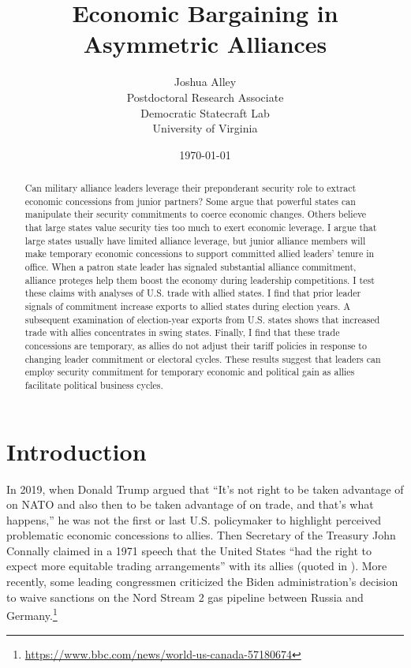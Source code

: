 \documentclass[12pt]{article}
\title{\textbf{Economic Bargaining in Asymmetric Alliances}}
\author{
Joshua Alley\\
Postdoctoral Research Associate\\
Democratic Statecraft Lab\\
University of Virginia 
}
\date{\today}
\begin{document}
\maketitle 

\begin{abstract}
Can military alliance leaders leverage their preponderant security role to extract economic concessions from junior partners?
Some argue that powerful states can manipulate their security commitments to coerce economic changes. 
Others believe that large states value security ties too much to exert economic leverage.  
I argue that large states usually have limited alliance leverage, but junior alliance members will make temporary economic concessions to support committed allied leaders' tenure in office.
When a patron state leader has signaled substantial alliance commitment, alliance proteges help them boost the economy during leadership competitions.  
I test these claims with analyses of U.S. trade with allied states. 
I find that prior leader signals of commitment increase exports to allied states during election years. 
A subsequent examination of election-year exports from U.S. states shows that increased trade with allies concentrates in swing states. 
Finally, I find that these trade concessions are temporary, as allies do not adjust their tariff policies in response to changing leader commitment or electoral cycles. 
These results suggest that leaders can employ security commitment for temporary economic and political gain as allies facilitate political business cycles. 
\end{abstract} 


\newpage 
\doublespace 


\section{Introduction}

In 2019, when Donald Trump argued that ``It's not right to be taken advantage of on NATO and also then to be taken advantage of on trade, and that's what happens,'' he was not the first or last U.S. policymaker to highlight perceived problematic economic concessions to allies.
Then Secretary of the Treasury John Connally claimed in a 1971 speech that the United States ``had the right to expect more equitable trading arrangements'' with its allies (quoted in \citet[pg 175]{Sayle2019}).
More recently, some leading congressmen criticized the Biden administration's decision to waive sanctions on the Nord Stream 2 gas pipeline between Russia and Germany.\footnote{\url{https://www.bbc.com/news/world-us-canada-57180674}}
\end{document}
